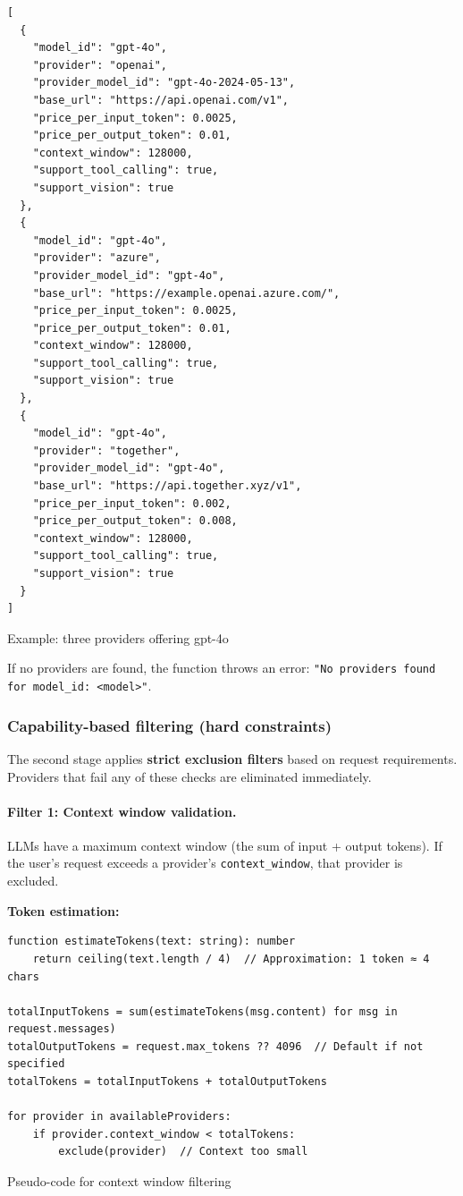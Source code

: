 \documentclass[english]{article}
\begin{document}
\begin{listing}[H]
\begin{verbatim}
[
  {
    "model_id": "gpt-4o",
    "provider": "openai",
    "provider_model_id": "gpt-4o-2024-05-13",
    "base_url": "https://api.openai.com/v1",
    "price_per_input_token": 0.0025,
    "price_per_output_token": 0.01,
    "context_window": 128000,
    "support_tool_calling": true,
    "support_vision": true
  },
  {
    "model_id": "gpt-4o",
    "provider": "azure",
    "provider_model_id": "gpt-4o",
    "base_url": "https://example.openai.azure.com/",
    "price_per_input_token": 0.0025,
    "price_per_output_token": 0.01,
    "context_window": 128000,
    "support_tool_calling": true,
    "support_vision": true
  },
  {
    "model_id": "gpt-4o",
    "provider": "together",
    "provider_model_id": "gpt-4o",
    "base_url": "https://api.together.xyz/v1",
    "price_per_input_token": 0.002,
    "price_per_output_token": 0.008,
    "context_window": 128000,
    "support_tool_calling": true,
    "support_vision": true
  }
]
\end{verbatim}
\caption{Example: three providers offering gpt-4o}
\end{listing}

If no providers are found, the function throws an error: \texttt{"No providers found for model\_id: <model>"}.

\subsubsection{Capability-based filtering (hard constraints)}

The second stage applies \textbf{strict exclusion filters} based on request requirements. Providers that fail any of these checks are eliminated immediately.

\paragraph{Filter 1: Context window validation.}

LLMs have a maximum context window (the sum of input + output tokens). If the user's request exceeds a provider's \texttt{context\_window}, that provider is excluded.

\textbf{Token estimation:}
\begin{listing}[H]
\begin{verbatim}
function estimateTokens(text: string): number
    return ceiling(text.length / 4)  // Approximation: 1 token ≈ 4 chars

totalInputTokens = sum(estimateTokens(msg.content) for msg in request.messages)
totalOutputTokens = request.max_tokens ?? 4096  // Default if not specified
totalTokens = totalInputTokens + totalOutputTokens

for provider in availableProviders:
    if provider.context_window < totalTokens:
        exclude(provider)  // Context too small
\end{verbatim}
\caption{Pseudo-code for context window filtering}
\end{listing}
\end{document}
